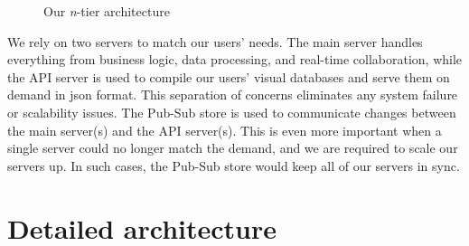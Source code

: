 \begin{toexclude}
\begin{figure}[H]

    \caption{Our \emph{n}-tier architecture}
    \label{fig:ntier-arch}
  \end{figure}

  We rely on two servers to match our users' needs. The main server handles everything from business logic, data processing, and real-time collaboration, while the API server is used to compile our users' visual databases and serve them on demand in \acrshort{json} format.
  This separation of concerns eliminates any system failure or scalability issues.
  The Pub-Sub store is used to communicate changes between the main server(s) and the API server(s).
  This is even more important when a single server could no longer match the demand, and we are required to scale our servers up.
  In such cases, the Pub-Sub store would keep all of our servers in sync.

\end{toexclude}

\section{Detailed architecture}


